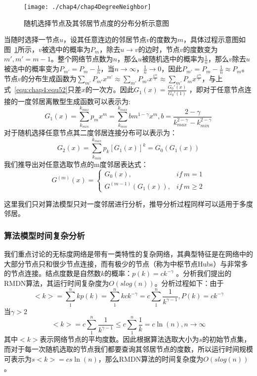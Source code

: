 \begin{figure}[H]
	\centering
	\texttt{[image: ./chap4/chap4DegreeNeighbor]}
	\caption{随机选择节点及其邻居节点度的分布分析示意图}
	\label{fig:chap4DegreeNeighbor}
\end{figure}

当随时选择一节点$u$，设其任意连边的邻居节点$v$的度数为$m$，具体过程示意图如图~\ref{fig:chap4DegreeNeighbor}所示，$v$被选中的概率为$P_m$，除去$u\to v$的边时，节点$v$的度数变为$m',m'= m-1$。整个网络节点数为$n$，那么$u$被随机选中的概率为$\frac{1}{n}$，那么$v$除去$u$被选中的概率变为$P_{m'}=P_m-\frac{1}{n}$，当$n\to \infty $，$\frac{1}{n} \to 0$，因此$P_{m'}=P_m-\frac{1}{n} \approx P_m$。节点$v$的分布生成函数为$\sum_{m'}P_{m'}x^{m'} \approx \sum_{m'}P_{m'}x^{\frac{x^m}{x}} \approx \sum_{m'}P_{m}x^{\frac{x^m}{x}} $，与上式~\ref{equ:chap4:equ52}只差$x$的一次方。因此$G_1(x)=\frac{G_0'(x)}{G_0'(1)}$
，即对于任意节点连接的一度邻居离散型生成函数可以表示为:
\begin{equation}
\label{equ:chap4:equ8}
G_{1}(x) = \sum_{k_{min}}^{k_{max}}p_{m}x^{m} = \sum_{k_{min}}^{k_{max}}bm^{1-\gamma}x^{m}, b = \frac{2-\gamma}{k_{max}^{2-\gamma}-k_{min}^{2-\gamma}}
\end{equation}
对于随机选择任意节点其二度邻居连接分布可以表示为：
\begin{equation}
\label{equ:chap4:equ9}
G_{2}(x) = \sum_{k_{min}}^{k_{max}}p_{k}{[G_{1}(x)]}^{k} = G_{0}(G_{1}(x))
\end{equation}
我们推导出对任意选取节点的m度邻居表达式：
\begin{equation}
\label{equ:chap4:equ10}
G^{(m)}(x) = 
\begin{cases} 
G_{0}(x), & if ~ m = 1 \\
G^{(m-1)}(G_{1}(x)), & if ~ m \geq 2
\end{cases}
\end{equation}

这里我们只对算法模型只对一度邻居进行分析，推导分析过程同样可以适用于多度邻居。
\subsubsection{算法模型时间复杂分析}
我们重点讨论的无标度网络是带有一类特性的复杂网络，其典型特征是在网络中的大部分节点只和很少节点连接，而有极少的节点（称为中枢节点Hubs）与非常多的节点连接。结点度数是自然数$k$的概率：$p(k) = ck^{-\gamma}$ \cite{cohen2003efficient}。分析我们提出的RMDN算法，其运行时间复杂度为$O(slog(n))$。分析过程如下：由于
\begin{equation}
<k>=\sum_ {1}^{n}kp(k)=\sum_{1}^{n}kck^{-\gamma}=c\sum_{1}^{n}\frac{1}{k^{\gamma -1}},P(k)=ck^{-\gamma}
\end{equation}
当$\gamma >2$
\begin{equation}
<k>=c\sum_{1}^{n}\frac{1}{k^{\gamma -1}} \le c\sum\limits_{1}^{n}\frac{1}{k}=c\ln (n),n\to \infty
\end{equation}
其中$<k>$表示网络节点的平均度数。因此根据算法选取大小为$s$的初始节点集，而对于每一次随机选取的节点我们都要查询其邻居节点的度数，所以运行时间规模可表示为$s<k>=cs\ln (n)$，那么RMDN算法的时间复杂度为$O(slog(n))$。

